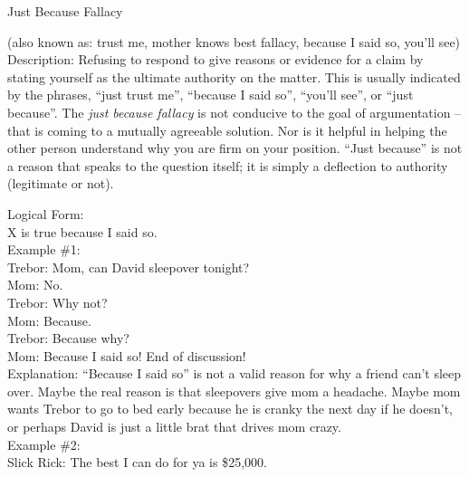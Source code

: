 \documentclass[a4paper,12pt,single,pdftex]{scrartcl}
\begin{document}
  

Just Because Fallacy
    
      (also known as: trust me, mother knows best fallacy, because I said so, you’ll see)
    \\

  
    Description: Refusing to respond to give reasons or evidence for a claim by stating yourself as the ultimate authority on the matter.  This is usually indicated by the phrases, “just trust me”, “because I said so”, “you’ll see”, or “just because”.  The {\it just because fallacy}  is not conducive to the goal of argumentation -- that is coming to a mutually agreeable solution.  Nor is it helpful in helping the other person understand why you are firm on your position. “Just because” is not a reason that speaks to the question itself; it is simply a deflection to authority (legitimate or not).

    
      Logical Form:
    \\

    
      X is true because I said so.
    \\

    
      Example \#1:
    \\

    
      Trebor: Mom, can David sleepover tonight?
    \\

    
      Mom: No.
    \\

    
      Trebor:  Why not?
    \\

    
      Mom: Because.
    \\

    
      Trebor: Because why?
    \\

    
      Mom: Because I said so!  End of discussion!
    \\

    
      Explanation: “Because I said so” is not a valid reason for why a friend can’t sleep over.  Maybe the real reason is that sleepovers give mom a headache.  Maybe mom wants Trebor to go to bed early because he is cranky the next day if he doesn’t, or perhaps David is just a little brat that drives mom crazy.
    \\

    
      Example \#2:
    \\

    
      Slick Rick: The best I can do for ya is \$25,000.
    \\
\end{document}
